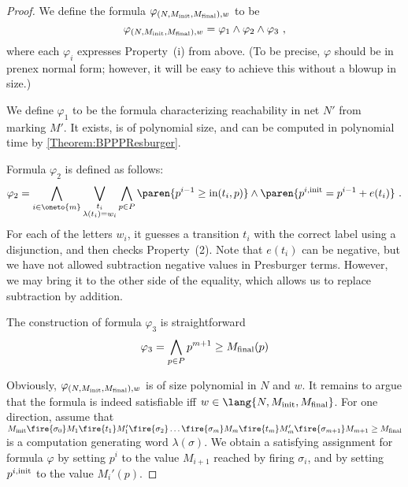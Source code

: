 \documentclass[../../diss.tex]{subfiles}
\begin{document}
\begin{proof}
    We define the formula $\varphi_{(N,M_{\text{init}},M_{\text{final}}),w}$ to be
    \[
        \varphi_{(N,M_{\text{init}},M_{\text{final}}),w} = \varphi_1 \wedge \varphi_2 \wedge \varphi_3
        \ ,
    \]
    where each $\varphi_i$ expresses Property~(i) from above.
    (To be precise, $\varphi$ should be in prenex normal form; however, it will be easy to achieve this without a blowup in size.)

    We define $\varphi_1$ to be the formula characterizing reachability in net $N'$ from marking $M'$.
    It exists, is of polynomial size, and can be computed in polynomial time by \cref{Theorem:BPPPResburger}.

    Formula $\varphi_2$ is defined as follows:
    \[
        \varphi_2 =
        \bigwedge_{i \in \oneto{m}}
        \bigvee_{\substack{t_i\\\lambda(t_i) = w_i}}
        \bigwedge_{p \in P}
            \paren {p^{i-1} \geq \i(t_i,p)}
            \wedge
            \paren {p^{i,\init} = p^{i-1} + e(t_i)}
        \ .
    \]
    For each of the letters $w_i$, it guesses a transition $t_i$ with the correct label using a disjunction, and then checks Property~(2).
    Note that $e(t_i)$ can be negative, but we have not allowed subtraction \resp negative values in Presburger terms.
    However, we may bring it to the other side of the equality, which allows us to replace subtraction by addition.

    The construction of formula $\varphi_3$ is straightforward
    \[
        \varphi_3 = \bigwedge_{p \in P} p^{m+1} \geq M_{\text{final}}(p)
    \]

    Obviously, $\varphi_{(N,M_{\text{init}},M_{\text{final}}),w}$ is of size polynomial in $N$ and $w$.
    It remains to argue that the formula is indeed satisfiable iff $w \in \lang{N,\Minit,\Mfinal}$.
    For one direction, assume that
    \(
        \Minit \fire{\sigma_0} M_1 \fire{t_1} M_1' \fire{\sigma_2} \ldots \fire{\sigma_m} M_m \fire{t_m} M_m' \fire{\sigma_{m+1}} M_{m+1} \geq \Mfinal
    \)
    is a computation generating word $\lambda(\sigma)$.
    We obtain a satisfying assignment for formula $\varphi$ by setting $p^i$ to the value $M_{i+1}$ reached by firing $\sigma_i$, and by setting $p^{i,{\text{init}}}$ to the  value $M_i'(p)$.



\end{proof}
\end{document}
